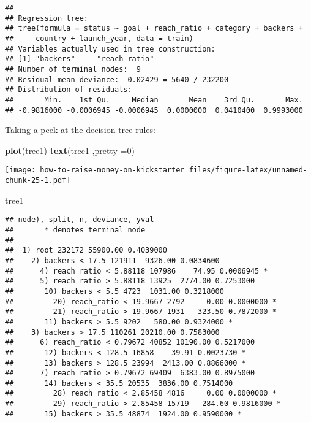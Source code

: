 \documentclass[]{article}
\newenvironment{Shaded}{\begin{snugshade}}{\end{snugshade}}
\newcommand{\KeywordTok}[1]{\textcolor[rgb]{0.13,0.29,0.53}{\textbf{#1}}}
\newcommand{\DataTypeTok}[1]{\textcolor[rgb]{0.13,0.29,0.53}{#1}}
\newcommand{\DecValTok}[1]{\textcolor[rgb]{0.00,0.00,0.81}{#1}}
\newcommand{\NormalTok}[1]{#1}
\begin{document}
\begin{verbatim}
## 
## Regression tree:
## tree(formula = status ~ goal + reach_ratio + category + backers + 
##     country + launch_year, data = train)
## Variables actually used in tree construction:
## [1] "backers"     "reach_ratio"
## Number of terminal nodes:  9 
## Residual mean deviance:  0.02429 = 5640 / 232200 
## Distribution of residuals:
##       Min.    1st Qu.     Median       Mean    3rd Qu.       Max. 
## -0.9816000 -0.0006945 -0.0006945  0.0000000  0.0410400  0.9993000
\end{verbatim}

Taking a peek at the decision tree rules:

\begin{Shaded}
\begin{Highlighting}[]
\KeywordTok{plot}\NormalTok{(tree1)}
\KeywordTok{text}\NormalTok{(tree1 ,}\DataTypeTok{pretty =}\DecValTok{0}\NormalTok{)}
\end{Highlighting}
\end{Shaded}

\texttt{[image: how-to-raise-money-on-kickstarter\_files/figure-latex/unnamed-chunk-25-1.pdf]}

\begin{Shaded}
\begin{Highlighting}[]
\NormalTok{tree1}
\end{Highlighting}
\end{Shaded}

\begin{verbatim}
## node), split, n, deviance, yval
##       * denotes terminal node
## 
##  1) root 232172 55900.00 0.4039000  
##    2) backers < 17.5 121911  9326.00 0.0834600  
##      4) reach_ratio < 5.88118 107986    74.95 0.0006945 *
##      5) reach_ratio > 5.88118 13925  2774.00 0.7253000  
##       10) backers < 5.5 4723  1031.00 0.3218000  
##         20) reach_ratio < 19.9667 2792     0.00 0.0000000 *
##         21) reach_ratio > 19.9667 1931   323.50 0.7872000 *
##       11) backers > 5.5 9202   580.00 0.9324000 *
##    3) backers > 17.5 110261 20210.00 0.7583000  
##      6) reach_ratio < 0.79672 40852 10190.00 0.5217000  
##       12) backers < 128.5 16858    39.91 0.0023730 *
##       13) backers > 128.5 23994  2413.00 0.8866000 *
##      7) reach_ratio > 0.79672 69409  6383.00 0.8975000  
##       14) backers < 35.5 20535  3836.00 0.7514000  
##         28) reach_ratio < 2.85458 4816     0.00 0.0000000 *
##         29) reach_ratio > 2.85458 15719   284.60 0.9816000 *
##       15) backers > 35.5 48874  1924.00 0.9590000 *
\end{verbatim}
\end{document}
